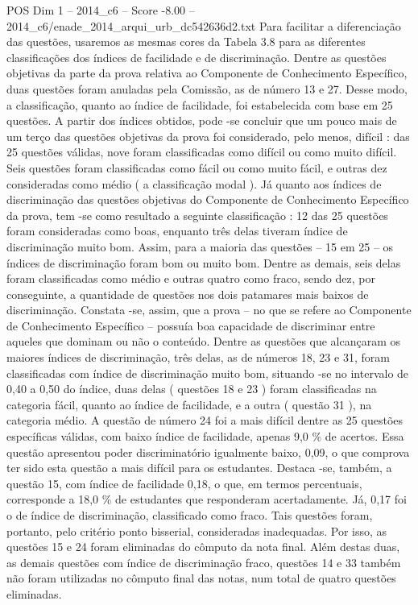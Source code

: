 \begin{textsample}{POS Dim 1 – 2014\_c6 – Score -8.00 – 2014\_c6/enade\_2014\_arqui\_urb\_dc542636d2.txt}
Para facilitar a diferenciação das questões, usaremos as mesmas cores da Tabela 3.8 para as diferentes classificações dos índices de facilidade e de discriminação.
Dentre as questões objetivas da parte da prova relativa ao Componente de Conhecimento Específico, duas questões foram anuladas pela Comissão, as de número 13 e 27.
Desse modo, a classificação, quanto ao índice de facilidade, foi estabelecida com base em 25 questões.
A partir dos índices obtidos, pode -se concluir que um pouco mais de um terço das questões objetivas da prova foi considerado, pelo menos, difícil : das 25 questões válidas, nove foram classificadas como difícil ou como muito difícil.
Seis questões foram classificadas como fácil ou como muito fácil, e outras dez consideradas como médio ( a classificação modal ).
Já quanto aos índices de discriminação das questões objetivas do Componente de Conhecimento Específico da prova, tem -se como resultado a seguinte classificação : 12 das 25 questões foram consideradas como boas, enquanto três delas tiveram índice de discriminação muito bom.
Assim, para a maioria das questões – 15 em 25 – os índices de discriminação foram bom ou muito bom.
Dentre as demais, seis delas foram classificadas como médio e outras quatro como fraco, sendo dez, por conseguinte, a quantidade de questões nos dois patamares mais baixos de discriminação.
Constata -se, assim, que a prova – no que se refere ao Componente de Conhecimento Específico – possuía boa capacidade de discriminar entre aqueles que dominam ou não o conteúdo.
Dentre as questões que alcançaram os maiores índices de discriminação, três delas, as de números 18, 23 e 31, foram classificadas com índice de discriminação muito bom, situando -se no intervalo de 0,40 a 0,50 do índice, duas delas ( questões 18 e 23 ) foram classificadas na categoria fácil, quanto ao índice de facilidade, e a outra ( questão 31 ), na categoria médio.
A questão de número 24 foi a mais difícil dentre as 25 questões específicas válidas, com baixo índice de facilidade, apenas 9,0 \% de acertos.
Essa questão apresentou poder discriminatório igualmente baixo, 0,09, o que comprova ter sido esta questão a mais difícil para os estudantes.
Destaca -se, também, a questão 15, com índice de facilidade 0,18, o que, em termos percentuais, corresponde a 18,0 \% de estudantes que responderam acertadamente.
Já, 0,17 foi o de índice de discriminação, classificado como fraco.
Tais questões foram, portanto, pelo critério ponto bisserial, consideradas inadequadas.
Por isso, as questões 15 e 24 foram eliminadas do cômputo da nota final.
Além destas duas, as demais questões com índice de discriminação fraco, questões 14 e 33 também não foram utilizadas no cômputo final das notas, num total de quatro questões eliminadas.

\end{textsample}
